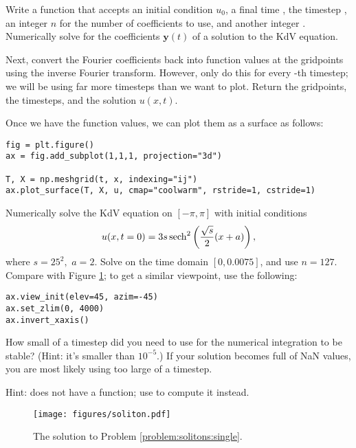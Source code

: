 \begin{problem}
Write a function that accepts an initial condition \(u_0\), a final time , the timestep , an integer \(n\) for the number of coefficients to use, and another integer .
Numerically solve for the coefficients \(\mathbf{y}(t)\) of a solution to the KdV equation.

Next, convert the Fourier coefficients back into function values at the gridpoints using the inverse Fourier transform.
However, only do this for every -th timestep; we will be using far more timesteps than we want to plot.
Return the gridpoints, the timesteps, and the solution \(u(x,t)\).
\end{problem}

\noindent
Once we have the function values, we can plot them as a surface as follows:
\begin{lstlisting}
fig = plt.figure()
ax = fig.add_subplot(1,1,1, projection="3d")

T, X = np.meshgrid(t, x, indexing="ij")
ax.plot_surface(T, X, u, cmap="coolwarm", rstride=1, cstride=1)
\end{lstlisting}

\begin{problem}
Numerically solve the KdV equation on $[-\pi,\pi]$ with initial conditions
\[
u(x,t=0) = 3s\operatorname{sech}^2\left(\frac{\sqrt{s}}{2}(x+a)\right),
\]
where $s = 25^2,$ $a = 2$. Solve on the time domain $[0,0.0075]$, and use \(n=127\).
Compare with Figure \ref{fig:solitons:single}; to get a similar viewpoint, use the following:
\begin{lstlisting}
ax.view_init(elev=45, azim=-45)
ax.set_zlim(0, 4000)
ax.invert_xaxis()
\end{lstlisting} %
How small of a timestep did you need to use for the numerical integration to be stable?
(Hint: it's smaller than $10^{-5}$.)
If your solution becomes full of NaN values, you are most likely using too large of a timestep.
\label{problem:solitons:single}

\noindent
Hint:  does not have a  function; use  to compute it instead.
\end{problem}

\begin{figure}[H]
\centering
\texttt{[image: figures/soliton.pdf]}
\caption{The solution to Problem \ref{problem:solitons:single}.}
\label{fig:solitons:single}
\end{figure}


